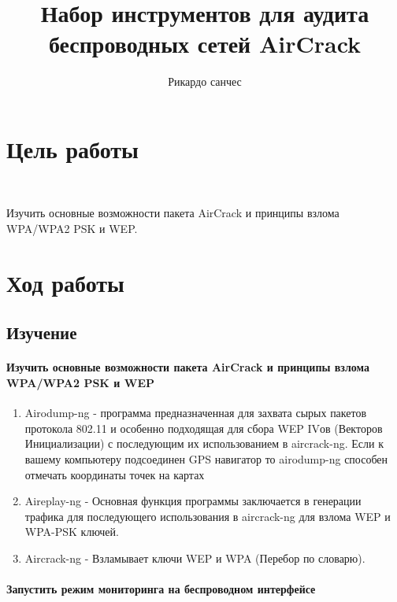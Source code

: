 \documentclass[10pt,a4paper]{article}
\author{Рикардо санчес}
\date{}
\title{Набор инструментов для аудита беспроводных сетей AirCrack}
\begin{document}
\maketitle

\section{Цель работы}
~

Изучить основные возможности пакета AirCrack и принципы взлома WPA/WPA2 PSK и WEP.

\section{Ход работы}
\subsection{Изучение}

\paragraph{Изучить основные возможности пакета AirCrack и принципы взлома WPA/WPA2 PSK и WEP}

\begin{enumerate}
\item Airodump-ng - программа предназначенная для захвата сырых пакетов протокола 802.11 и особенно подходящая для сбора WEP IVов (Векторов Инициализации) с последующим их использованием в aircrack-ng. Если к вашему компьютеру подсоединен GPS навигатор
то airodump-ng способен отмечать координаты точек на картах

\item Aireplay-ng - Основная функция программы заключается в генерации трафика для последующего использования в aircrack-ng для взлома WEP и WPA-PSK ключей.

\item Aircrack-ng - Взламывает ключи WEP и WPA (Перебор по словарю).
\end{enumerate}

\paragraph{Запустить режим мониторинга на беспроводном интерфейсе}
\end{document}
